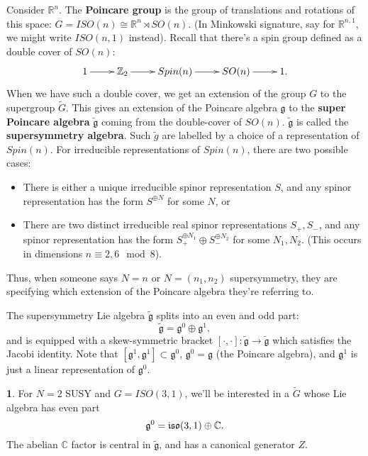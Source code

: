 \documentclass[oneside,english]{amsbook}
\numberwithin{section}{chapter}
\numberwithin{equation}{section}
\numberwithin{figure}{section}
\theoremstyle{plain}
\theoremstyle{definition}
\theoremstyle{remark}
\theoremstyle{definition}
\newtheorem*{example*}{\protect\examplename}
\theoremstyle{definition}
\theoremstyle{plain}
\providecommand{\examplename}{Example}
\begin{document}
Consider $\mathbb{R}^{n}$. The \textbf{Poincare group} is the group
of translations and rotations of this space: $G=ISO(n)\cong\mathbb{R}^{n}\rtimes SO(n)$.
(In Minkowski signature, say for $\mathbb{R}^{n,1}$, we might write
$ISO(n,1)$ instead). Recall that there's a spin group defined as
a double cover of $SO(n)$:
\[
\xymatrix{1\ar[r] & \mathbb{Z}_{2}\ar[r] & Spin(n)\ar[r] & SO(n)\ar[r] & 1.}
\]
When we have such a double cover, we get an extension of the group
$G$ to the supergroup $\tilde{G}$. This gives an extension of the
Poincare algebra $\mathfrak{g}$ to the \textbf{super Poincare algebra}
$\tilde{\mathfrak{g}}$ coming from the double-cover of $SO(n)$.
$\tilde{\mathfrak{g}}$ is called the \textbf{supersymmetry algebra}.
Such $\tilde{g}$ are labelled by a choice of a representation of
$Spin(n)$. For irreducible representations of $Spin(n)$, there are
two possible cases:
\begin{itemize}
\item There is either a unique irreducible spinor representation $S$, and
any spinor representation has the form $S^{\oplus N}$ for some $N$,
or
\item There are two distinct irreducible real spinor representations $S_{+},S_{-}$,
and any spinor representation has the form $S_{+}^{\oplus N_{1}}\oplus S_{-}^{\oplus N_{2}}$
for some $N_{1},N_{2}$. (This occurs in dimensions $n\equiv2,6\mod8$).
\end{itemize}
Thus, when someone says $N=n$ or $N=\left(n_{1},n_{2}\right)$ supersymmetry,
they are specifying which extension of the Poincare algebra they're
referring to.

The supersymmetry Lie algebra $\tilde{\mathfrak{g}}$ splits into
an even and odd part:
\[
\tilde{\mathfrak{g}}=\mathfrak{g}^{0}\oplus\mathfrak{g}^{1},
\]
and is equipped with a skew-symmetric bracket $\left[\cdot,\cdot\right]:\tilde{\mathfrak{g}}\rightarrow\tilde{\mathfrak{g}}$
which satisfies the Jacobi identity. Note that $\left[\mathfrak{g}^{1},\mathfrak{g}^{1}\right]\subset\mathfrak{g}^{0}$,
$\mathfrak{g}^{0}=\mathfrak{g}$ (the Poincare algebra), and $\mathfrak{g}^{1}$
is just a linear representation of $\mathfrak{g}^{0}$.
\begin{example*}
For $N=2$ SUSY and $G=ISO(3,1)$, we'll be interested in a $\tilde{G}$
whose Lie algebra has even part
\[
\mathfrak{g}^{0}=\mbox{\ensuremath{\mathfrak{iso}}}(3,1)\oplus\mathbb{C}.
\]
The abelian $\mathbb{C}$ factor is central in $\tilde{\mathfrak{g}}$,
and has a canonical generator $Z$.
\end{example*}
\end{document}
